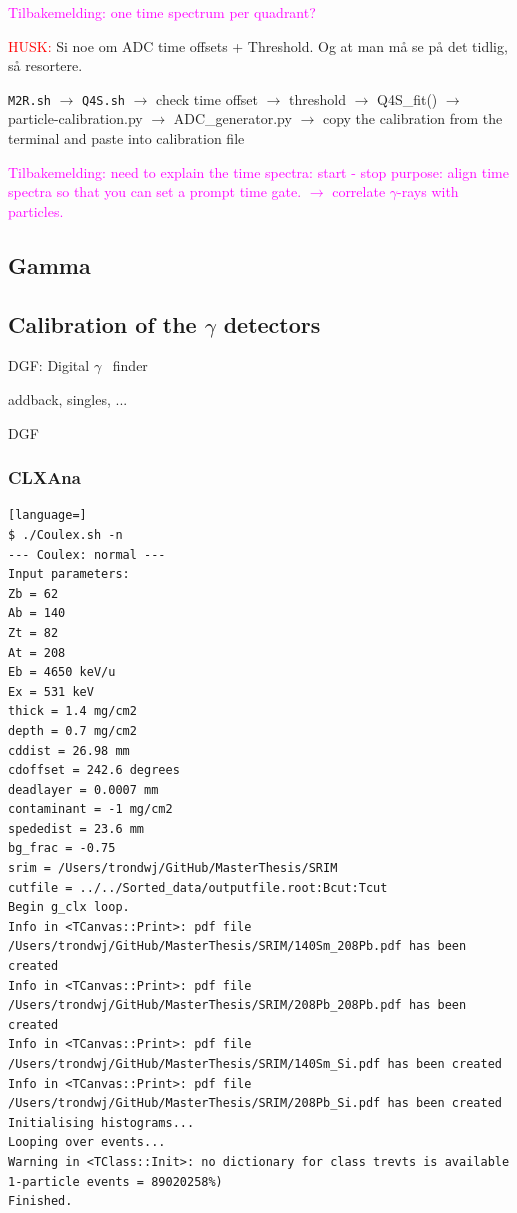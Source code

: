 \documentclass[twoside,english]{uiofysmaster/uiofysmaster}
\newcommand{\ga}{$\gamma$}
\begin{document}
\textcolor{Magenta}{Tilbakemelding: \newline 
one time spectrum per quadrant?
}


\textcolor{red}{HUSK:} Si noe om ADC time offsets + Threshold. Og at man må se på det tidlig, så resortere.


\texttt{M2R.sh} $\rightarrow$ \texttt{Q4S.sh} $\rightarrow$ check time offset $\rightarrow$ threshold $\rightarrow$ Q4S\_fit() $\rightarrow$ particle-calibration.py $\rightarrow$  ADC\_generator.py $\rightarrow$ copy the calibration from the terminal and paste into calibration file 

\textcolor{Magenta}{Tilbakemelding: \newline 
need to explain the time spectra: start - stop \newline
purpose: align time spectra so that you can set a prompt time gate. \newline
$\rightarrow$ correlate $\gamma$-rays with particles.
}






\subsection{Gamma}

\subsection*{Calibration of the \texorpdfstring{$\gamma$}{Gamma} detectors}

DGF: Digital \ga~ finder

addback, singles, ...


\begin{table}[ht] 
	\centering 
	\caption{DGF}
	
	\label{tab:DGF}
\end{table}


\subsubsection{CLXAna}
\begin{lstlisting}[language=]
$ ./Coulex.sh -n
--- Coulex: normal ---
Input parameters:
Zb = 62
Ab = 140
Zt = 82
At = 208
Eb = 4650 keV/u
Ex = 531 keV
thick = 1.4 mg/cm2
depth = 0.7 mg/cm2
cddist = 26.98 mm
cdoffset = 242.6 degrees
deadlayer = 0.0007 mm
contaminant = -1 mg/cm2
spededist = 23.6 mm
bg_frac = -0.75
srim = /Users/trondwj/GitHub/MasterThesis/SRIM
cutfile = ../../Sorted_data/outputfile.root:Bcut:Tcut
Begin g_clx loop.
Info in <TCanvas::Print>: pdf file /Users/trondwj/GitHub/MasterThesis/SRIM/140Sm_208Pb.pdf has been created
Info in <TCanvas::Print>: pdf file /Users/trondwj/GitHub/MasterThesis/SRIM/208Pb_208Pb.pdf has been created
Info in <TCanvas::Print>: pdf file /Users/trondwj/GitHub/MasterThesis/SRIM/140Sm_Si.pdf has been created
Info in <TCanvas::Print>: pdf file /Users/trondwj/GitHub/MasterThesis/SRIM/208Pb_Si.pdf has been created
Initialising histograms...
Looping over events...
Warning in <TClass::Init>: no dictionary for class trevts is available
1-particle events = 89020258%)    
Finished.
\end{lstlisting}
\end{document}
